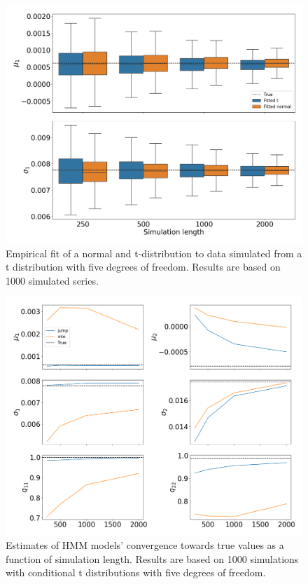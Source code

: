 \begin{figure}[H] 
    \centering
    \includegraphics[width=1\textwidth]{analysis/model_convergence/images/theoretical_fit_t_dist.png}
    \caption{Empirical fit of a normal and t-distribution to data simulated from a t distribution with five degrees of freedom. Results are based on 1000 simulated series.}
    \label{fig:jump_theoretical_fit}
\end{figure}

\begin{figure}[H] 
    \centering
    \includegraphics[width=1\textwidth]{analysis/model_convergence/images/simulation_t.png}
    \caption{Estimates of HMM models' convergence towards true values as a function of simulation length. Results are based on 1000 simulations with conditional t distributions with five degrees of freedom.}
    \label{fig:jump_t}
\end{figure}

